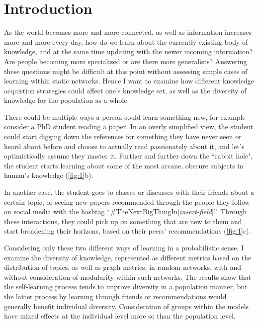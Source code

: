 \section{Introduction}

As the world becomes more and more connected, as well as information increases more and more every day, how do we learn about the currently existing body of knowledge, and at the same time updating with the newer incoming information? Are people becoming more specialized or are there more generalists? Answering these questions might be difficult at this point without assessing simple cases of learning within static networks. Hence I want to examine how different knowledge acquistion strategies could affect one's knowledge set, as well as the diversity of knowledge for the population as a whole.

There could be multiple ways a person could learn something new, for example consider a PhD student reading a paper. In an overly simplified view, the student could start digging down the references for something they have never seen or heard about before and choose to actually read passionately about it, and let's optimistically assume they master it. Further and further down the    ``rabbit hole", the student starts learning about some of the most arcane, obscure subjects in human's knowledge (\ref{fig:1}b).

In another case, the student goes to classes or discusses with their friends about a certain topic, or seeing new papers recommended through the people they follow on social media with the hashtag ``\#TheNextBigThingIn[\textit{insert-field}]''. Through these interactions, they could pick up on something that are new to them and start broadening their horizons, based on their peers' recommendations (\ref{fig:1}c).

Considering only these two different ways of learning in a probabilistic sense, I examine the diversity of knowledge, represented as different metrics based on the distribution of topics, as well as graph metrics, in random networks, with and without consideration of modularity within such networks. The results show that the self-learning process tends to improve diversity in a population manner, but the latter process by learning through friends or recommendations would generally benefit individual diversity. Consideration of groups within the models have mixed effects at the individual level more so than the population level.